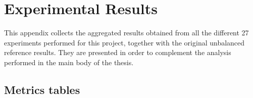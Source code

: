 \chapter{Experimental Results}
\label{app:experimental_results}

This appendix collects the aggregated results obtained from all the different 27 experiments performed for this project, together with the original unbalanced reference results. They are presented in order to complement the analysis performed in the main body of the thesis.

\section{Metrics tables}

\begin{table}[htbp]
    \centering
    \caption{DiaTrend results using the original unbalanced training distribution.}
    \label{tab:diatrend_baseline}
\end{table}



